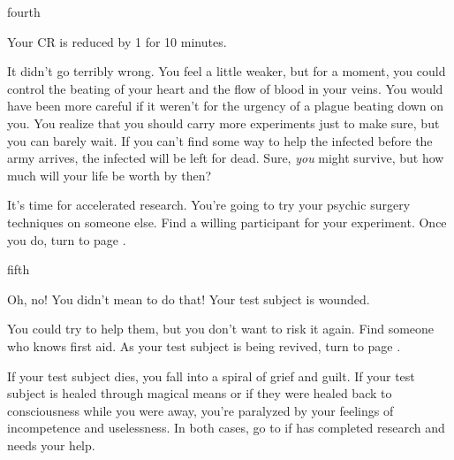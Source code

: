 \documentclass[greennotebook]{Pestilence} %
\begin{document}
\begin{page}{fourth}

Your CR is reduced by 1 for 10 minutes.

It didn't go terribly wrong. You feel a little weaker, but for a moment, you could control the beating of your heart and the flow of blood in your veins. You would have been more careful if it weren't for the urgency of a plague beating down on you. You realize that you should carry more experiments just to make sure, but you can barely wait. If you can't find some way to help the infected before the army arrives, the infected will be left for dead. Sure, \textit{you} might survive, but how much will your life be worth by then?

It's time for accelerated research. You're going to try your psychic surgery techniques on someone else. Find a willing participant for your experiment. Once you do, turn to page .

\end{page}

\begin{page}{fifth}

Oh, no! You didn't mean to do that! Your test subject is wounded.

You could try to help them, but you don't want to risk it again. Find someone who knows first aid. As your test subject is being revived, turn to page .

If your test subject dies, you fall into a spiral of grief and guilt. If your test subject is healed through magical means or if they were healed back to consciousness while you were away, you're paralyzed by your feelings of incompetence and uselessness. In both cases, go to  if \cOutsider{} has completed \cOutsider{\their} research and needs your help.

\end{page}
\end{document}
